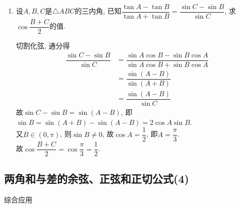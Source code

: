 \begin{enumerate}
\item 设$A,B,C$是$\triangle{ABC}$的三内角, 已知$\dfrac{\tan{A}-\tan{B}}{\tan{A}+\tan{B}}=\dfrac{\sin{C}-\sin{B}}{\sin{C}}$, 
求$\cos\dfrac{B+C}{2}$的值. 
\begin{jieda}
切割化弦, 通分得
\begin{align*}
\dfrac{\sin{C}-\sin{B}}{\sin{C}}
& =\dfrac{\sin{A}\cos{B}-\sin{B}\cos{A}}{\sin{A}\cos{B}+\sin{B}\cos{A}}\\
& =\dfrac{\sin(A-B)}{\sin(A+B)}\\
& =\dfrac{\sin(A-B)}{\sin{C}}
\end{align*}
故$\sin{C}-\sin{B}=\sin(A-B)$, 即$\sin{B}=\sin(A+B)-\sin(A-B)=2\cos{A}\sin{B}$. \\
又$B\in(0,\pi)$, 则$\sin{B}\neq 0$, 故$\cos{A}=\dfrac{1}{2}$, 即$A=\dfrac{\pi}{3}$. \\
故$\cos\dfrac{B+C}{2}=\cos\dfrac{\pi}{3}=\dfrac{1}{2}$. 
\end{jieda}
\end{enumerate}




\subsection{两角和与差的余弦、正弦和正切公式(4)}
\zsd 综合应用


